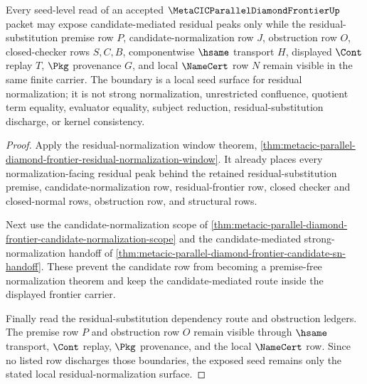 \begin{theorem}
\label{thm:metacic-parallel-diamond-frontier-seed-boundary}
Every seed-level read of an accepted $\MetaCICParallelDiamondFrontierUp$ packet may expose candidate-mediated residual peaks only while the residual-substitution premise row $P$, candidate-normalization row $J$, obstruction row $O$, closed-checker rows $S,C,B$, componentwise $\hsame$ transport $H$, displayed $\Cont$ replay $T$, $\Pkg$ provenance $G$, and local $\NameCert$ row $N$ remain visible in the same finite carrier. The boundary is a local seed surface for residual normalization; it is not strong normalization, unrestricted confluence, quotient term equality, evaluator equality, subject reduction, residual-substitution discharge, or kernel consistency.
\end{theorem}
\begin{proof}
Apply the residual-normalization window theorem, \autoref{thm:metacic-parallel-diamond-frontier-residual-normalization-window}. It already places every normalization-facing residual peak behind the retained residual-substitution premise, candidate-normalization row, residual-frontier row, closed checker and closed-normal rows, obstruction row, and structural rows.

Next use the candidate-normalization scope of \autoref{thm:metacic-parallel-diamond-frontier-candidate-normalization-scope} and the candidate-mediated strong-normalization handoff of \autoref{thm:metacic-parallel-diamond-frontier-candidate-sn-handoff}. These prevent the candidate row from becoming a premise-free normalization theorem and keep the candidate-mediated route inside the displayed frontier carrier.

Finally read the residual-substitution dependency route and obstruction ledgers. The premise row $P$ and obstruction row $O$ remain visible through $\hsame$ transport, $\Cont$ replay, $\Pkg$ provenance, and the local $\NameCert$ row. Since no listed row discharges those boundaries, the exposed seed remains only the stated local residual-normalization surface.
\end{proof}
